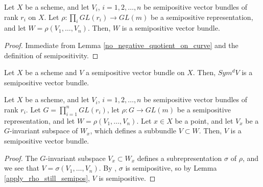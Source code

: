 \begin{lemma}\label{apply_rho_still_semipos}
Let $X$ be a scheme, and let $V_i$, $i=1,2,\ldots,n$ be semipositive vector bundles of rank $r_i$ on $X$. 
Let $\rho:\prod_i GL(r_i)\to GL(m)$ be a semipositive representation, and let $W=\rho(V_1,\ldots,V_n)$. 
Then, $W$ is a semipositive vector bundle.
\end{lemma}

\begin{proof}
Immediate from Lemma \ref{no_negative_quotient_on_curve} and the definition of semipositivity.
\end{proof}

\begin{lemma}
Let $X$ be a scheme and $V$ a semipositive vector bundle on $X$. 
Then, $Sym^dV$ is a semipositive vector bundle.
\end{lemma}


\begin{lemma}
Let $X$ be a scheme, and let $V_i$, $i=1,2,\ldots,n$ be semipositive vector bundles of rank $r_i$. 
Let $G=\prod_{i=1}^{n}GL(r_i)$, let $\rho:G\to GL(m)$ be a semipositive representation, and let $W=\rho(V_1,\ldots,V_n)$. Let $x\in X$ be a point, and let $V_x$ be a $G$-invariant subspace of $W_x$, which defines a subbundle $V\subset W$. 
Then, $V$ is a semipositive vector bundle.
\end{lemma}

\begin{proof}
The $G$-invariant subspace $V_x\subset W_x$ defines a subrepresentation $\sigma$ of $\rho$, and we see that $V=\sigma(V_1,\ldots,V_n)$.
 By , $\sigma$ is semipositive, so by Lemma \ref{apply_rho_still_semipos}, $V$ is semipositive.
\end{proof}







